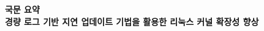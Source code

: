 \documentclass[doctor,korean,final]{kmu}
\begin{document}




\newif\ifkor
\kortrue 

%

\tableofcontents
\listoffigures

\setcounter{page}{\value{pagemarker}}         %
\label{paperlastromanpagelabel}     %

\hfill \break


\noindent
\Large{\textbf{국문 요약}}
\newline
\\
\noindent
\Large{\textbf{경량 로그 기반 지연 업데이트 기법을 활용한 리눅스 커널 확장성 향상}}
\end{document}
